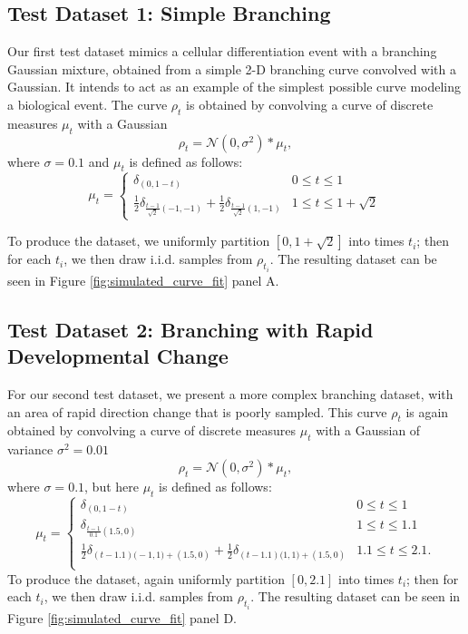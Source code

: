 \documentclass[aos, preprint]{imsart}
\theoremstyle{plain}
\theoremstyle{remark}
\begin{document}
\begin{appendix}
\subsection*{Test Dataset 1: Simple Branching}
Our first test dataset mimics a cellular differentiation event with a branching Gaussian mixture, obtained from a simple 2-D branching curve convolved with a Gaussian. It intends to act as an example of the simplest possible curve modeling a biological event. The curve $\rho_t$ is obtained by convolving a curve of discrete measures $\mu_t$ with a Gaussian
$$\rho_t = \mathcal{N}(0,\sigma^2) * \mu_t,$$
where $\sigma=0.1$ and $\mu_t$ is defined as follows:
\begin{equation*}
    \mu_t = \begin{cases}
         \delta_{(0, 1 -t)} &  0 \leq t \leq 1\\
        \frac{1}{2} \delta_{\frac{t-1}{\sqrt{2}}(-1, -1)}+\frac 1 2 \delta_{\frac{t-1}{\sqrt{2}}(1, -1)}
        & 1 \le t \leq 1 + \sqrt{2}
    \end{cases}
\end{equation*}

To produce the dataset, we uniformly partition $[0, 1 + \sqrt{2}]$ into times $t_i$; then for each $t_i$, we then draw i.i.d. samples from $\rho_{t_i}$. The resulting dataset can be seen in Figure \ref{fig:simulated_curve_fit} panel A.

\subsection*{Test Dataset 2: Branching with Rapid Developmental Change}
For our second test dataset, we present a more complex branching dataset, with an area of rapid direction change that is poorly sampled. This curve $\rho_t$ is again obtained by convolving a curve of discrete measures $\mu_t$ with a Gaussian of variance $\sigma^2 = 0.01$
$$\rho_t = \mathcal{N}(0,\sigma^2) * \mu_t,$$
where $\sigma=0.1$, but here $\mu_t$ is defined as follows:
\begin{equation*}
    \mu_t = \begin{cases}
        \delta_{(0, 1-t)} & 0 \leq t \leq 1 \\
        \delta_{\frac{t-1}{0.1}(1.5, 0)} & 1 \le t \leq 1.1 \\
        \frac12 \delta_{(t-1.1) \big(-1, 1 \big) + (1.5, 0)} + \frac12 \delta_{(t-1.1) \big (1, 1 \big ) + (1.5, 0)} & 1.1 \le t \leq 2.1. \\
    \end{cases}
\end{equation*}
To produce the dataset, again uniformly partition $[0, 2.1]$ into times $t_i$; then for each $t_i$, we then draw i.i.d. samples from $\rho_{t_i}$. The resulting dataset can be seen in Figure \ref{fig:simulated_curve_fit} panel D.


\end{appendix}
\end{document}
